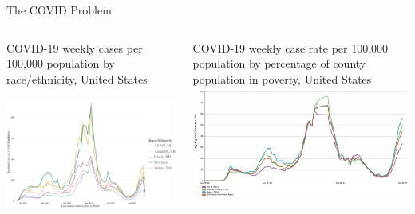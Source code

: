 \begin{slide}{The COVID Problem}
	\centering
	\begin{columns}[T]
		\begin{column}{.5\textwidth}
			\centering
			COVID-19 weekly cases per 100,000 population by race/ethnicity, United States
			\includegraphics[height=4.5cm]{images/ethnicity-trends}
		\end{column}
		\begin{column}{.5\textwidth}
			\centering
			COVID-19 weekly case rate per 100,000 population by percentage of county population in poverty, United States
			\includegraphics[height=3.7cm]{images/poverty-trends}
		\end{column}
	\end{columns}
\end{slide}